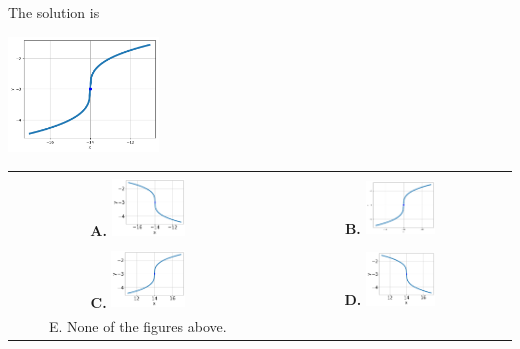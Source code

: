 \documentclass{article}[14pt]
\begin{document}
 
 The solution is  
 \begin{center} \includegraphics[width=0.3\textwidth]{../Figures/radicalEquationToGraphCB.png} \end{center}\begin{tabular}{|c|c|} 
\hline 
 & \tabularnewline 
 \textbf{A.} \includegraphics[width=0.3\textwidth]{../Figures/radicalEquationToGraphCA.png} & \textbf{B.} \includegraphics[width=0.3\textwidth]{../Figures/radicalEquationToGraphCB.png} \tabularnewline 
\hline 
 & \tabularnewline 
 \textbf{C.} \includegraphics[width=0.3\textwidth]{../Figures/radicalEquationToGraphCC.png} & \textbf{D.} \includegraphics[width=0.3\textwidth]{../Figures/radicalEquationToGraphCD.png} \tabularnewline 
\hline 
 E. None of the figures above. & \tabularnewline 
\hline 
 \end{tabular} 
 
\end{document}
